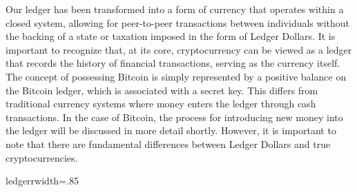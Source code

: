 Our ledger has been transformed into a form of currency that operates within a closed system, allowing for peer-to-peer transactions between
individuals without the backing of a state or taxation imposed in the form of Ledger Dollars. It is important to recognize that, at its core,
cryptocurrency can be viewed as a ledger that records the history of financial transactions, serving as the currency itself.
The concept of possessing Bitcoin is simply represented by a positive balance on the Bitcoin ledger, which is associated with a secret key.
This differs from traditional currency systems where money enters the ledger through cash transactions. In the case of Bitcoin, the process
for introducing new money into the ledger will be discussed in more detail shortly. However, it is important to note that there are
fundamental differences between Ledger Dollars and true cryptocurrencies.

{ledgerr}{width=.85\textwidth}%
